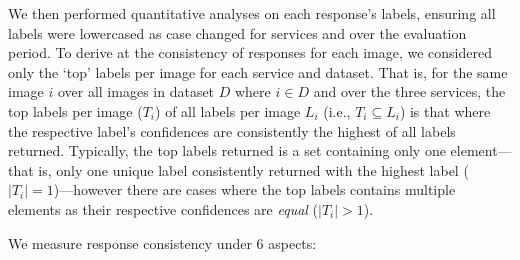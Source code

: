 We then performed quantitative analyses on each response's labels, ensuring all labels were lowercased as case changed for services \googleapi{} and \awsapi{} over the evaluation period. To derive at the consistency of responses for each image, we considered only the `top' labels per image for each service and dataset. That is, for the same image $i$ over all images in dataset $D$ where $i \in D$ and over the three services, the top labels per image ($T_{i}$) of all labels per image $L_{i}$ (i.e., $T_{i} \subseteq L_{i}$) is that where the respective label's confidences are consistently the highest of all labels returned. 
Typically, the top labels returned is a set containing only one element---that is, only one unique label consistently returned with the highest label ($| T_{i} | = 1$)---however there are cases where the top labels contains multiple elements as their respective confidences are \textit{equal} ($| T_{i} | > 1$).

We measure response consistency under 6 aspects:


